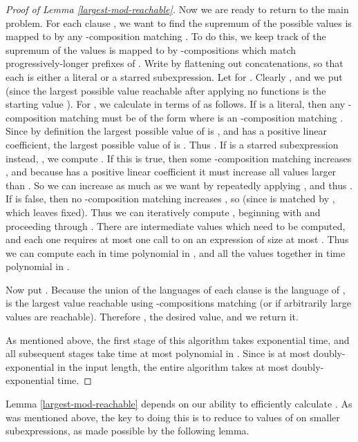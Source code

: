 \documentclass[11pt]{amsart}
\theoremstyle{definition}
\theoremstyle{remark}
\begin{document}
\begin{proof}[Proof of Lemma \ref{largest-mod-reachable}]
Now we are ready to return to the main problem. For each clause , we want to find the supremum  of the possible values  is mapped to by any -composition matching . To do this, we keep track of the supremum of the values  is mapped to by -compositions which match progressively-longer prefixes of . Write  by flattening out concatenations, so that each  is either a literal or a starred subexpression. Let  for . Clearly , and we put  (since the largest possible value reachable after applying no functions is the starting value ). For , we calculate  in terms of  as follows. If  is a literal, then any -composition matching  must be of the form  where  is an -composition matching . Since by definition the largest possible value of  is , and  has a positive linear coefficient, the largest possible value of  is . Thus . If  is a starred subexpression instead, , we compute . If this is true, then some -composition  matching  increases , and because  has a positive linear coefficient it must increase all values larger than . So we can increase  as much as we want by repeatedly applying , and thus . If  is false, then no -composition matching  increases , so  (since  is matched by , which leaves  fixed). Thus we can iteratively compute , beginning with  and proceeding through . There are  intermediate values  which need to be computed, and each one requires at most one call to  on an expression of size at most . Thus we can compute each  in time polynomial in , and all the values  together in time polynomial in .

Now put . Because the union of the languages of each clause  is the language of ,  is the largest value reachable using -compositions matching  (or  if arbitrarily large values are reachable). Therefore , the desired value, and we return it.

As mentioned above, the first stage of this algorithm takes exponential time, and all subsequent stages take time at most polynomial in . Since  is at most doubly-exponential in the input length, the entire algorithm takes at most doubly-exponential time.
\end{proof}

Lemma \ref{largest-mod-reachable} depends on our ability to efficiently calculate . As was mentioned above, the key to doing this is to reduce  to values of  on smaller subexpressions, as made possible by the following lemma.
\end{document}
